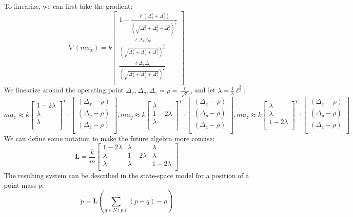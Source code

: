 To linearize, we can first take the gradient:
\[
\nabla(m a_x) = k \begin{bmatrix}
    1 - \frac{\ell (\Delta_y^2 + \Delta_z^2) }{(\sqrt{\Delta_x^2 + \Delta_y^2 + \Delta_z^2}) ^\frac{3}{2}} \\
    \frac{\ell \Delta_x \Delta_y }{(\sqrt{\Delta_x^2 + \Delta_y^2 + \Delta_z^2}) ^\frac{3}{2}} \\
    \frac{\ell \Delta_x \Delta_z }{(\sqrt{\Delta_x^2 + \Delta_y^2 + \Delta_z^2}) ^\frac{3}{2}} \\
\end{bmatrix} 
\]
We linearize around the operating point $\Delta_x, \Delta_y,\Delta_z = \rho = \frac{\ell}{\sqrt{3}}$, and let $\lambda = \frac{1}{3}\ell^{\frac{3}{2}}$:
{\footnotesize \[
m a_x \approx  k \begin{bmatrix}
    1 - 2 \lambda \\
    \lambda \\
    \lambda \\
\end{bmatrix}^T \cdot \begin{bmatrix}
    (\Delta_x - \rho) \\
    (\Delta_y - \rho)\\
    (\Delta_z - \rho) \\
\end{bmatrix}, m a_y \approx  k \begin{bmatrix}
    \lambda \\
    1-2\lambda \\
    \lambda \\
\end{bmatrix}^T \cdot \begin{bmatrix}
    (\Delta_x - \rho) \\
    (\Delta_y - \rho)\\
    (\Delta_z - \rho) \\
\end{bmatrix}, m a_z \approx  k \begin{bmatrix}
    \lambda \\
    \lambda \\
    1-2\lambda \\
\end{bmatrix}^T \cdot \begin{bmatrix}
    (\Delta_x - \rho) \\
    (\Delta_y - \rho)\\
    (\Delta_z - \rho) \\
\end{bmatrix}
\]
}
We can define some notation to make the future algebra more concise:
\[
\mathbf{L} = \frac{k}{m} \begin{bmatrix}
   1- 2\lambda & \lambda & \lambda  \\
    \lambda & 1- 2\lambda & \lambda \\
    \lambda & \lambda  & 1-2\lambda \\
\end{bmatrix}
\]
The resulting system can be described in the state-space model for a position of a point mass $p$:
\begin{equation}
\ddot{p} = \mathbf{L} (\sum_{q \in N(p) }  (p - q) - \rho)
\end{equation}

